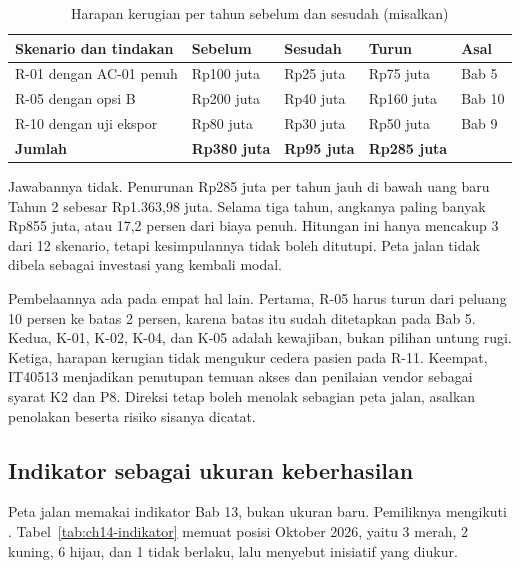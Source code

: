 \begin{table}[!htb]
  \centering\small
  \caption{Harapan kerugian per tahun sebelum dan sesudah (misalkan)}\label{tab:ch14-manfaat}
  \begin{tabularx}{\textwidth}{|>{\raggedright\arraybackslash}X|>{\raggedright\arraybackslash}p{}|>{\raggedright\arraybackslash}p{}|>{\raggedright\arraybackslash}p{}|>{\raggedright\arraybackslash}p{}|}
    \hline
    \textbf{Skenario dan tindakan} & \textbf{Sebelum} & \textbf{Sesudah} & \textbf{Turun} &
    \textbf{Asal} \\ \hline
    R-01 dengan AC-01 penuh & Rp100 juta & Rp25 juta & Rp75 juta & Bab 5 \\ \hline
    R-05 dengan opsi B & Rp200 juta & Rp40 juta & Rp160 juta & Bab 10 \\ \hline
    R-10 dengan uji ekspor & Rp80 juta & Rp30 juta & Rp50 juta & Bab 9 \\ \hline
    \textbf{Jumlah} & \textbf{Rp380 juta} & \textbf{Rp95 juta} & \textbf{Rp285 juta} & \\ \hline
  \end{tabularx}
\end{table}

Jawabannya tidak. Penurunan Rp285 juta per tahun jauh di bawah uang baru Tahun 2 sebesar Rp1.363,98
juta. Selama tiga tahun, angkanya paling banyak Rp855 juta, atau 17,2 persen dari biaya penuh.
Hitungan ini hanya mencakup 3 dari 12 skenario, tetapi kesimpulannya tidak boleh ditutupi. Peta
jalan tidak dibela sebagai investasi yang kembali modal.

Pembelaannya ada pada empat hal lain. Pertama, R-05 harus turun dari peluang 10 persen ke batas 2
persen, karena batas itu sudah ditetapkan pada Bab 5. Kedua, K-01, K-02, K-04, dan K-05 adalah
kewajiban, bukan pilihan untung rugi. Ketiga, harapan kerugian tidak mengukur cedera pasien pada
R-11. Keempat, IT40513 menjadikan penutupan temuan akses dan penilaian vendor sebagai syarat K2
dan P8. Direksi tetap boleh menolak sebagian peta jalan, asalkan penolakan beserta risiko sisanya
dicatat.

\subsection*{Indikator sebagai ukuran keberhasilan}

Peta jalan memakai indikator Bab 13, bukan ukuran baru. Pemiliknya mengikuti
. Tabel~\ref{tab:ch14-indikator} memuat posisi
Oktober 2026, yaitu 3 merah, 2 kuning, 6 hijau, dan 1 tidak berlaku, lalu menyebut inisiatif yang
diukur.

